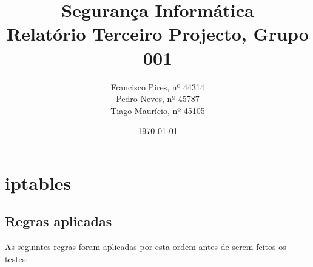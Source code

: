 \documentclass[12pt, a4paper, twoside]{report} %
\begin{document}
\title{%
	\textbf{Segurança Informática}\\ 
	\large Relatório Terceiro Projecto, Grupo 001
}

\author{%
Francisco Pires, nº 44314 \\
Pedro Neves, nº 45787 \\
Tiago Maurício, nº 45105 \\
}

\date{\today}
\maketitle

\chapter{iptables}

\section{Regras aplicadas}

As seguintes regras foram aplicadas por esta ordem antes de serem feitos os testes:
\end{document}
